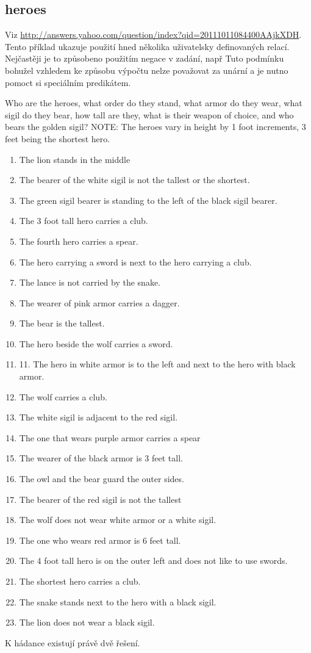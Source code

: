 \documentclass[11pt]{article} %
\begin{document}
\subsection{heroes}
Viz \url{http://answers.yahoo.com/question/index?qid=20111011084400AAjkXDH}. Tento příklad ukazuje použití hned několika uživatelsky definovaných relací. Nejčastěji je to způsobeno použitím negace v zadání, např  Tuto podmínku bohužel vzhledem ke způsobu výpočtu nelze považovat za unární a je nutno pomoct si speciálním predikátem.
\begin{framed}
Who are the heroes, what order do they stand, what armor do they wear, what sigil do they bear, how tall are they, what is their weapon of choice, and who bears the golden sigil?
 NOTE: The heroes vary in height by 1 foot increments, 3 feet being the shortest hero. 
\begin{enumerate} \itemsep1pt \parskip0pt 
\item The lion stands in the middle
\item The bearer of the white sigil is not the tallest or the shortest.
\item The green sigil bearer is standing to the left of the black sigil bearer.
\item The 3 foot tall hero carries a club.
\item The fourth hero carries a spear.
\item The hero carrying a sword is next to the hero carrying a club.
\item The lance is not carried by the snake.
\item The wearer of pink armor carries a dagger.
\item The bear is the tallest.
\item The hero beside the wolf carries a sword.
\item 11. The hero in white armor is to the left and next to the hero with black armor.
\item  The wolf carries a club.
\item  The white sigil is adjacent to the red sigil.
\item  The one that wears purple armor carries a spear
\item  The wearer of the black armor is 3 feet tall.
\item  The owl and the bear guard the outer sides.
\item  The bearer of the red sigil is not the tallest
 \item The wolf does not wear white armor or a white sigil.
 \item The one who wears red armor is 6 feet tall.
 \item The 4 foot tall hero is on the outer left and does not like to use swords.
 \item The shortest hero carries a club.
 \item The snake stands next to the hero with a black sigil.
\item  The lion does not wear a black sigil.
\end{enumerate}
\end{framed}
K hádance existují právě dvě řešení.
\end{document}
